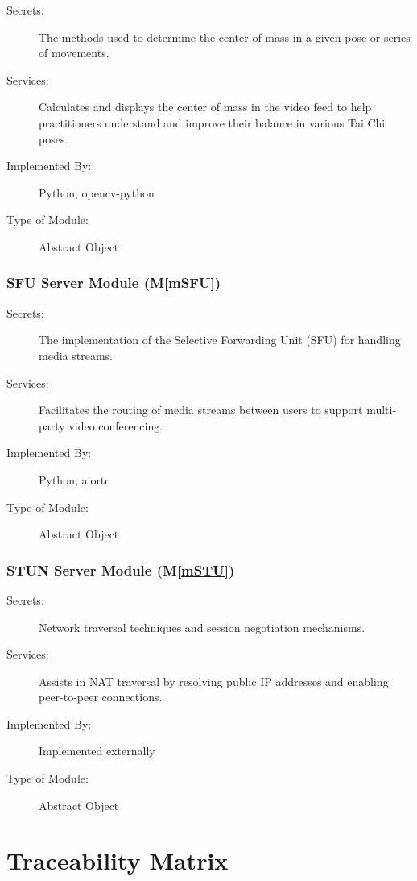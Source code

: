 \documentclass[12pt, titlepage]{article}
\newcommand{\mref}[1]{M\ref{#1}}
\begin{document}
\begin{description}
\item[Secrets:] The methods used to determine the center of mass in a given pose or series of movements.
\item[Services:] Calculates and displays the center of mass in the video feed to help practitioners understand and improve their balance in various Tai Chi poses.
\item[Implemented By:] Python, opencv-python
\item[Type of Module:] Abstract Object
\end{description}

\subsubsection{SFU Server Module (\mref{mSFU})}

\begin{description}
\item[Secrets:] The implementation of the Selective Forwarding Unit (SFU) for handling media streams.
\item[Services:] Facilitates the routing of media streams between users to support multi-party video conferencing.
\item[Implemented By:] Python, aiortc
\item[Type of Module:] Abstract Object
\end{description}

\subsubsection{STUN Server Module (\mref{mSTU})}

\begin{description}
\item[Secrets:] Network traversal techniques and session negotiation mechanisms.
\item[Services:] Assists in NAT traversal by resolving public IP addresses and enabling peer-to-peer connections.
\item[Implemented By:] Implemented externally
\item[Type of Module:] Abstract Object
\end{description}

\section{Traceability Matrix} \label{SecTM}
\end{document}
